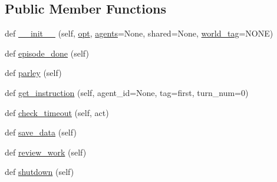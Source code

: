 \subsection*{Public Member Functions}
\begin{DoxyCompactItemize}
\item 
def \hyperlink{classimage__chat__collection_1_1worlds_1_1MTurkImageChatWorld_aa4c8a2169f71ac876be070a1c9c5cbdc}{\+\_\+\+\_\+init\+\_\+\+\_\+} (self, \hyperlink{classparlai_1_1core_1_1worlds_1_1World_a3640d92718acd3e6942a28c1ab3678bd}{opt}, \hyperlink{classimage__chat__collection_1_1worlds_1_1MTurkImageChatWorld_a4a6b3bbe92761e075e8763997d452b65}{agents}=None, shared=None, \hyperlink{classimage__chat__collection_1_1worlds_1_1MTurkImageChatWorld_a0be08870bfc570382e035bc0b6119b62}{world\+\_\+tag}=\textquotesingle{}N\+O\+NE\textquotesingle{})
\item 
def \hyperlink{classimage__chat__collection_1_1worlds_1_1MTurkImageChatWorld_a27c215716de1649559eca384ed71d0f8}{episode\+\_\+done} (self)
\item 
def \hyperlink{classimage__chat__collection_1_1worlds_1_1MTurkImageChatWorld_a7af5e011cc93106144797115af770537}{parley} (self)
\item 
def \hyperlink{classimage__chat__collection_1_1worlds_1_1MTurkImageChatWorld_ab3caeb29dc340a476579b1cc8d101608}{get\+\_\+instruction} (self, agent\+\_\+id=None, tag=\textquotesingle{}first\textquotesingle{}, turn\+\_\+num=0)
\item 
def \hyperlink{classimage__chat__collection_1_1worlds_1_1MTurkImageChatWorld_a333c8d7353ed7fba417461177035c209}{check\+\_\+timeout} (self, act)
\item 
def \hyperlink{classimage__chat__collection_1_1worlds_1_1MTurkImageChatWorld_ac4710715dfda617f14c962e641fd16b9}{save\+\_\+data} (self)
\item 
def \hyperlink{classimage__chat__collection_1_1worlds_1_1MTurkImageChatWorld_a02bb22cb19e1f1ccecab9043a18741e1}{review\+\_\+work} (self)
\item 
def \hyperlink{classimage__chat__collection_1_1worlds_1_1MTurkImageChatWorld_aace5207ebc6f75d797a87003eeded08d}{shutdown} (self)
\end{DoxyCompactItemize}
